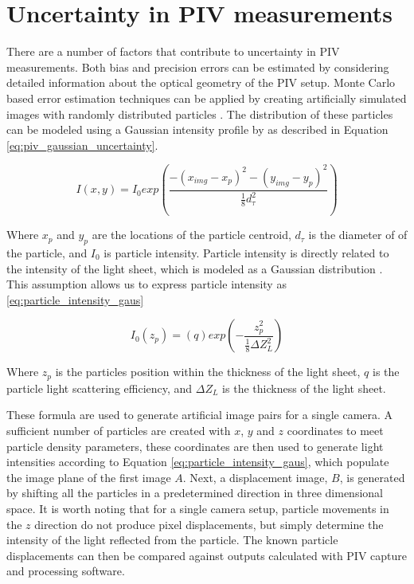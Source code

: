 \section{Uncertainty in PIV measurements}
\label{sec:piv_uncert}
 
There are a number of factors that contribute to uncertainty in PIV 
measurements. Both bias and precision errors can be estimated by considering 
detailed information about the optical geometry of the PIV setup. Monte Carlo 
based error estimation techniques can be applied by creating artificially 
simulated images with randomly distributed particles \cite{adeyinka2005}. 
The distribution of these particles can be modeled using a Gaussian intensity  
profile by \cite{raffel1998} as described in Equation 
\ref{eq:piv_gaussian_uncertainty}.

\begin{equation}
	I(x,y) = I_0exp \left( \frac{-(x_{img} - x_p)^2 - (y_{img} - y_p)^2}
	{\frac{1}{8}d_\tau^2} \right)
	\label{eq:piv_gaussian_uncertainty}
\end{equation}

Where $x_p$ and $y_p$ are the locations of the particle centroid, $d_\tau$ is 
the diameter of of the particle, and $I_0$ is particle intensity. Particle 
intensity is directly related to the intensity of the light sheet, which is 
modeled as a Gaussian distribution \cite{PIVuncertAIAA}. This assumption allows 
us 
to express particle intensity as \ref{eq:particle_intensity_gaus}

\begin{equation}
	I_0(z_p) = (q)exp\left(- \frac{z_p^2}{\frac{1}{8}\Delta Z_L^2}\right)
	\label{eq:particle_intensity_gaus}
\end{equation}

Where $z_p$ is the particles position within the thickness of the light sheet, 
$q$ is the particle light scattering efficiency, and $\Delta Z_L$ is the 
thickness of the light sheet.

These formula are used to generate artificial image pairs for a single camera. 
A sufficient number of particles are created with $x$, $y$ and $z$ coordinates 
to meet particle density parameters, these coordinates are then 
used to generate light intensities according to Equation 
\ref{eq:particle_intensity_gaus}, which populate the image plane of the first 
image $A$. Next, a displacement image, $B$, is generated by shifting all the 
particles in a predetermined direction in three dimensional space. It is worth 
noting that for a single camera setup, particle movements in the $z$ direction 
do not produce pixel displacements, but simply determine the intensity of the 
light reflected from the particle. The known particle displacements can then be 
compared against outputs calculated with PIV capture and processing software.

